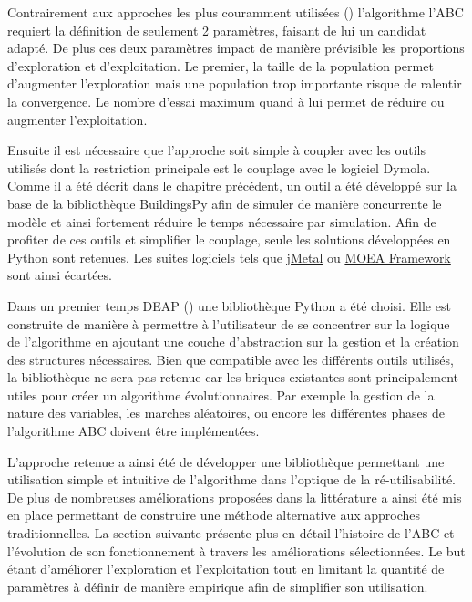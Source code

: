 Contrairement aux approches les plus couramment utilisées ()
l’algorithme l’ABC requiert la définition de seulement 2
paramètres, faisant de lui un candidat adapté. De plus ces deux paramètres impact
de manière prévisible les proportions d’exploration et d’exploitation. Le premier,
la taille de la population permet d’augmenter l’exploration mais une population
trop importante risque de ralentir la convergence. Le nombre d’essai maximum quand
à lui permet de réduire ou augmenter l’exploitation.

Ensuite il est nécessaire que l’approche soit simple à coupler avec les outils
utilisés dont la restriction principale est le couplage avec le logiciel Dymola.
Comme il a été décrit dans le chapitre précédent, un outil a été développé sur la
base de la bibliothèque BuildingsPy afin de simuler de manière concurrente le modèle
et ainsi fortement réduire le temps nécessaire par simulation.
Afin de profiter de ces outils et simplifier le couplage, seule les solutions
développées en Python sont retenues. Les suites logiciels tels que
\href{http://jmetal.sourceforge.net/index.html}{jMetal} ou
\href{http://moeaframework.org/index.html}{MOEA Framework} sont ainsi écartées.

Dans un premier temps DEAP () une bibliothèque Python a été
choisi. Elle est construite de manière à permettre à l’utilisateur de se concentrer sur la
logique de l’algorithme en ajoutant une couche d’abstraction sur la gestion et la
création des structures nécessaires.
Bien que compatible avec les différents outils utilisés, la bibliothèque ne sera
pas retenue car les briques existantes sont principalement utiles pour créer un
algorithme évolutionnaires. Par exemple la gestion de la nature des variables,
les marches aléatoires, ou encore les différentes phases de l’algorithme ABC
doivent être implémentées.

L’approche retenue a ainsi été de développer une bibliothèque permettant une utilisation
simple et intuitive de l’algorithme dans l’optique de la ré-utilisabilité. De plus
de nombreuses améliorations proposées dans la littérature a ainsi été mis en place
permettant de construire une méthode alternative aux approches traditionnelles.
La section suivante présente plus en détail l’histoire de l’ABC et l’évolution de
son fonctionnement à travers les améliorations sélectionnées.
Le but étant d’améliorer l’exploration et l’exploitation tout en limitant la quantité
de paramètres à définir de manière empirique afin de simplifier son utilisation.



